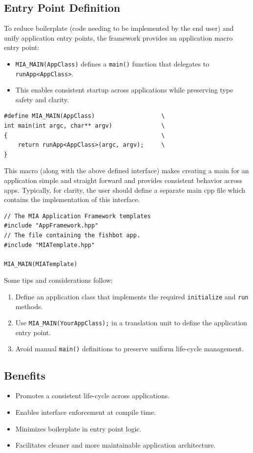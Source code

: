 \subsection*{Entry Point Definition}
To reduce boilerplate (code needing to be implemented by the end user) and unify application entry points, the framework provides an application macro entry point:
\begin{itemize}\itemsep0em
	\item \texttt{MIA\_MAIN(AppClass)} defines a \texttt{main()} function that delegates to \texttt{runApp<AppClass>}.
	\item This enables consistent startup across applications while preserving type safety and clarity.
\end{itemize}
\begin{lstlisting}[style=cppstyle]
#define MIA_MAIN(AppClass)                   \
int main(int argc, char** argv)              \
{                                            \
    return runApp<AppClass>(argc, argv);     \
}
\end{lstlisting}
This macro (along with the above defined interface) makes creating a main for an application simple and straight forward and provides consistent behavior across apps. Typically, for clarity, the user should define a separate main cpp file which contains the implementation of this interface.
\begin{lstlisting}[style=cppstyle]
// The MIA Application Framework templates
#include "AppFramework.hpp"
// The file containing the fishbot app.
#include "MIATemplate.hpp"

MIA_MAIN(MIATemplate)
\end{lstlisting}
Some tips and considerations follow:
\begin{enumerate}
	\item Define an application class that implements the required \texttt{initialize} and \texttt{run} methods.
	\item Use \texttt{MIA\_MAIN(YourAppClass);} in a translation unit to define the application entry point.
	\item Avoid manual \texttt{main()} definitions to preserve uniform life-cycle management.
\end{enumerate}

\subsection*{Benefits}
\begin{itemize}\itemsep0em
	\item Promotes a consistent life-cycle across applications.
	\item Enables interface enforcement at compile time.
	\item Minimizes boilerplate in entry point logic.
	\item Facilitates cleaner and more maintainable application architecture.
\end{itemize}











